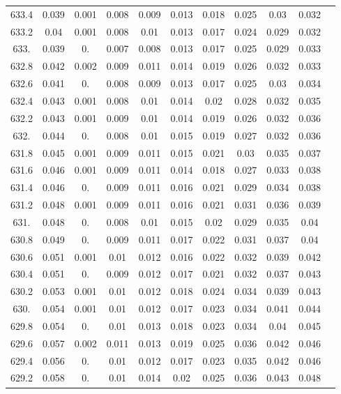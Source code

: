 \documentclass[12pt]{ctexart}
\numberwithin{equation}{section}
\begin{document}
\begin{longtable}{ccccccccccc}
633.4	&	0.039	&	0.001	&	0.008	&	0.009	&	0.013	&	0.018	&	0.025	&	0.03	&	0.032	\\
633.2	&	0.04	&	0.001	&	0.008	&	0.01	&	0.013	&	0.017	&	0.024	&	0.029	&	0.032	\\
633.	&	0.039	&	0.	&	0.007	&	0.008	&	0.013	&	0.017	&	0.025	&	0.029	&	0.033	\\
632.8	&	0.042	&	0.002	&	0.009	&	0.011	&	0.014	&	0.019	&	0.026	&	0.032	&	0.033	\\
632.6	&	0.041	&	0.	&	0.008	&	0.009	&	0.013	&	0.017	&	0.025	&	0.03	&	0.034	\\
632.4	&	0.043	&	0.001	&	0.008	&	0.01	&	0.014	&	0.02	&	0.028	&	0.032	&	0.035	\\
632.2	&	0.043	&	0.001	&	0.009	&	0.01	&	0.014	&	0.019	&	0.026	&	0.032	&	0.036	\\
632.	&	0.044	&	0.	&	0.008	&	0.01	&	0.015	&	0.019	&	0.027	&	0.032	&	0.036	\\
631.8	&	0.045	&	0.001	&	0.009	&	0.011	&	0.015	&	0.021	&	0.03	&	0.035	&	0.037	\\
631.6	&	0.046	&	0.001	&	0.009	&	0.011	&	0.014	&	0.018	&	0.027	&	0.033	&	0.038	\\
631.4	&	0.046	&	0.	&	0.009	&	0.011	&	0.016	&	0.021	&	0.029	&	0.034	&	0.038	\\
631.2	&	0.048	&	0.001	&	0.009	&	0.011	&	0.016	&	0.021	&	0.031	&	0.036	&	0.039	\\
631.	&	0.048	&	0.	&	0.008	&	0.01	&	0.015	&	0.02	&	0.029	&	0.035	&	0.04	\\
630.8	&	0.049	&	0.	&	0.009	&	0.011	&	0.017	&	0.022	&	0.031	&	0.037	&	0.04	\\
630.6	&	0.051	&	0.001	&	0.01	&	0.012	&	0.016	&	0.022	&	0.032	&	0.039	&	0.042	\\
630.4	&	0.051	&	0.	&	0.009	&	0.012	&	0.017	&	0.021	&	0.032	&	0.037	&	0.043	\\
630.2	&	0.053	&	0.001	&	0.01	&	0.012	&	0.018	&	0.024	&	0.034	&	0.039	&	0.043	\\
630.	&	0.054	&	0.001	&	0.01	&	0.012	&	0.017	&	0.023	&	0.034	&	0.041	&	0.044	\\
629.8	&	0.054	&	0.	&	0.01	&	0.013	&	0.018	&	0.023	&	0.034	&	0.04	&	0.045	\\
629.6	&	0.057	&	0.002	&	0.011	&	0.013	&	0.019	&	0.025	&	0.036	&	0.042	&	0.046	\\
629.4	&	0.056	&	0.	&	0.01	&	0.012	&	0.017	&	0.023	&	0.035	&	0.042	&	0.046	\\
629.2	&	0.058	&	0.	&	0.01	&	0.014	&	0.02	&	0.025	&	0.036	&	0.043	&	0.048	\\

\end{longtable}
\end{document}
